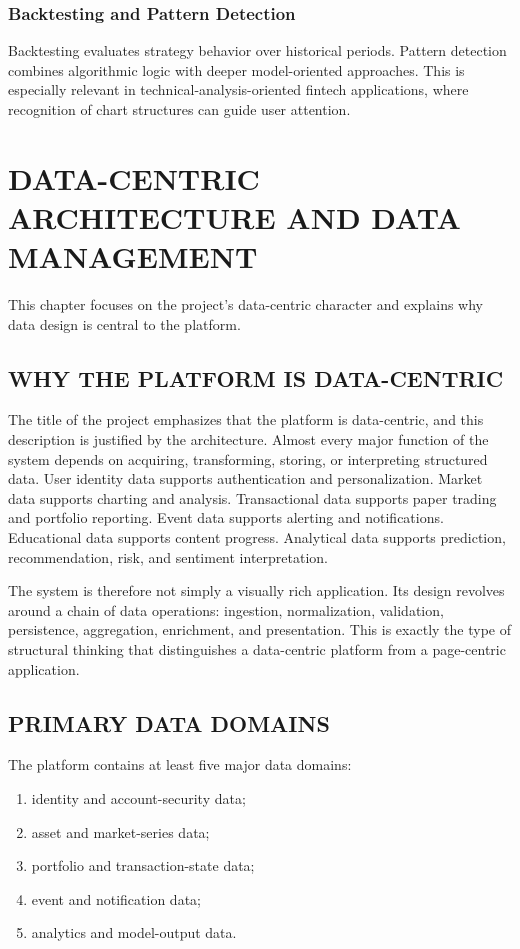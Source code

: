\documentclass[12pt,a4paper]{report}
\begin{document}
\subsection{Backtesting and Pattern Detection}
Backtesting evaluates strategy behavior over historical periods. Pattern detection combines algorithmic logic with deeper model-oriented approaches. This is especially relevant in technical-analysis-oriented fintech applications, where recognition of chart structures can guide user attention.

\chapter{DATA-CENTRIC ARCHITECTURE AND DATA MANAGEMENT}
This chapter focuses on the project's data-centric character and explains why data design is central to the platform.

\section{WHY THE PLATFORM IS DATA-CENTRIC}
The title of the project emphasizes that the platform is data-centric, and this description is justified by the architecture. Almost every major function of the system depends on acquiring, transforming, storing, or interpreting structured data. User identity data supports authentication and personalization. Market data supports charting and analysis. Transactional data supports paper trading and portfolio reporting. Event data supports alerting and notifications. Educational data supports content progress. Analytical data supports prediction, recommendation, risk, and sentiment interpretation.

The system is therefore not simply a visually rich application. Its design revolves around a chain of data operations: ingestion, normalization, validation, persistence, aggregation, enrichment, and presentation. This is exactly the type of structural thinking that distinguishes a data-centric platform from a page-centric application.

\section{PRIMARY DATA DOMAINS}
The platform contains at least five major data domains:
\begin{enumerate}[label=\arabic*.]
\item identity and account-security data;
\item asset and market-series data;
\item portfolio and transaction-state data;
\item event and notification data;
\item analytics and model-output data.
\end{enumerate}
\end{document}
